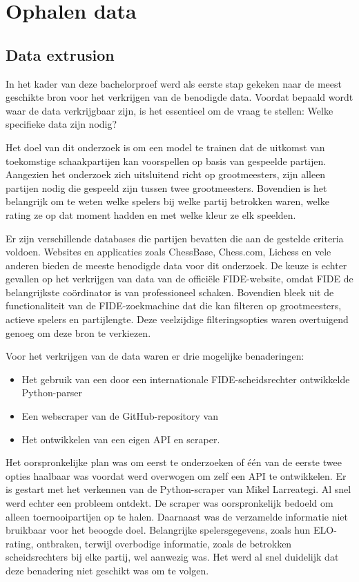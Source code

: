 \section{Ophalen data}

\subsection{Data extrusion}

In het kader van deze bachelorproef werd als eerste stap gekeken naar de meest geschikte bron voor het verkrijgen van de benodigde data. Voordat bepaald wordt waar de data verkrijgbaar zijn, is het essentieel om de vraag te stellen: Welke specifieke data zijn nodig?

Het doel van dit onderzoek is om een model te trainen dat de uitkomst van toekomstige schaakpartijen kan voorspellen op basis van gespeelde partijen. Aangezien het onderzoek zich uitsluitend richt op grootmeesters, zijn alleen partijen nodig die gespeeld zijn tussen twee grootmeesters. Bovendien is het belangrijk om te weten welke spelers bij welke partij betrokken waren, welke rating ze op dat moment hadden en met welke kleur ze elk speelden.

Er zijn verschillende databases die partijen bevatten die aan de gestelde criteria voldoen. Websites en applicaties zoals ChessBase, Chess.com, Lichess en vele anderen bieden de meeste benodigde data voor dit onderzoek. De keuze is echter gevallen op het verkrijgen van data van de officiële FIDE-website, omdat FIDE de belangrijkste coördinator is van professioneel schaken. Bovendien bleek uit de functionaliteit van de FIDE-zoekmachine dat die kan filteren op grootmeesters, actieve spelers en partijlengte. Deze veelzijdige filteringsopties waren overtuigend genoeg om deze bron te verkiezen.

Voor het verkrijgen van de data waren er drie mogelijke benaderingen:

\begin{itemize}
    \item Het gebruik van een door een internationale FIDE-scheidsrechter ontwikkelde Python-parser \autocite{Larreategi}
    \item Een webscraper van de GitHub-repository van \textcite{Alves2020}
    \item Het ontwikkelen van een eigen API en scraper.
\end{itemize}

Het oorspronkelijke plan was om eerst te onderzoeken of één van de eerste twee opties haalbaar was voordat werd overwogen om zelf een API te ontwikkelen. Er is gestart met het verkennen van de Python-scraper van Mikel Larreategi. Al snel werd echter een probleem ontdekt. De scraper was oorspronkelijk bedoeld om alleen toernooipartijen op te halen. Daarnaast was de verzamelde informatie niet bruikbaar voor het beoogde doel. Belangrijke spelersgegevens, zoals hun ELO-rating, ontbraken, terwijl overbodige informatie, zoals de betrokken scheidsrechters bij elke partij, wel aanwezig was. Het werd al snel duidelijk dat deze benadering niet geschikt was om te volgen.

